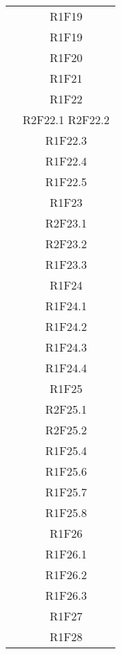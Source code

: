 \begin{center}
\begin{longtable}{|c|c|}
	 &  R1F19 \\
	 &  R1F19 \\
	 &  R1F20 \\
	 &  R1F21 \\
	 &  R1F22 \\
	 &  R2F22.1 R2F22.2 \\
	 &  R1F22.3 \\
	 &  R1F22.4 \\
	 &  R1F22.5 \\
	& R1F23 \\
	 & R2F23.1 \\
	 & R2F23.2 \\
	 & R1F23.3 \\
	 & R1F24 \\
	 & R1F24.1 \\
	 & R1F24.2 \\
	 & R1F24.3 \\
	 & R1F24.4 \\
	 & R1F25 \\
	 & R2F25.1 \\
	 & R2F25.2 \\
	 & R1F25.4 \\
	 & R1F25.6 \\
	 & R1F25.7 \\
	 & R1F25.8 \\
	 & R1F26 \\
	 & R1F26.1 \\
	 & R1F26.2 \\
	 & R1F26.3  \\
	 & R1F27 \\
	 & R1F28 \\
	\hline

	\end{longtable}
\end{center}



